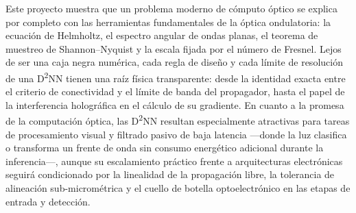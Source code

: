 Este proyecto muestra que un problema moderno de cómputo óptico se explica por completo con las
herramientas fundamentales de la óptica ondulatoria: la ecuación de Helmholtz, el espectro
angular de ondas planas, el teorema de muestreo de Shannon--Nyquist y la escala fijada por el
número de Fresnel. Lejos de ser una caja negra numérica, cada regla de diseño y cada límite de
resolución de una D\textsuperscript{2}NN tienen una raíz física transparente: desde la
identidad exacta entre el criterio de conectividad y el límite de banda del propagador, hasta
el papel de la interferencia holográfica en el cálculo de su gradiente. En cuanto a la promesa
de la computación óptica, las D\textsuperscript{2}NN resultan especialmente atractivas para
tareas de procesamiento visual y filtrado pasivo de baja latencia —donde la luz clasifica o
transforma un frente de onda sin consumo energético adicional durante la inferencia—, aunque
su escalamiento práctico frente a arquitecturas electrónicas seguirá condicionado por la
linealidad de la propagación libre, la tolerancia de alineación sub-micrométrica y el cuello de
botella optoelectrónico en las etapas de entrada y detección.
